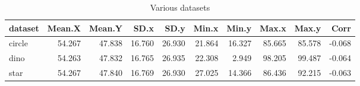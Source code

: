 \begin{table}[ht]
	\caption{Various datasets}
	\label{tbl:m08_01}
	\begin{tabular}{lrrrrrrrrr}
		\hline
		dataset & Mean.X & Mean.Y & SD.x   & SD.y   & Min.x  & Min.y  & Max.x  & Max.y  & Corr   \\\hline
		circle  & 54.267 & 47.838 & 16.760 & 26.930 & 21.864 & 16.327 & 85.665 & 85.578 & -0.068 \\
		dino    & 54.263 & 47.832 & 16.765 & 26.935 & 22.308 & 2.949  & 98.205 & 99.487 & -0.064 \\
		star    & 54.267 & 47.840 & 16.769 & 26.930 & 27.025 & 14.366 & 86.436 & 92.215 & -0.063 \\    \hline
	\end{tabular}
\end{table}
